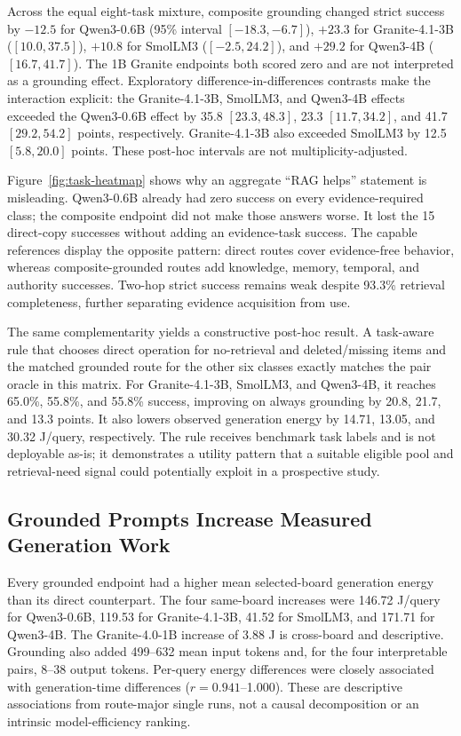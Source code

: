 Across the equal eight-task mixture, composite grounding changed strict success by
$-12.5$ \pp{} for Qwen3-0.6B (95\% interval $[-18.3,-6.7]$), $+23.3$ for
Granite-4.1-3B ($[10.0,37.5]$), $+10.8$ for SmolLM3 ($[-2.5,24.2]$), and $+29.2$
for Qwen3-4B ($[16.7,41.7]$). The 1B Granite endpoints both scored zero and are not
interpreted as a grounding effect. Exploratory difference-in-differences contrasts
make the interaction explicit: the Granite-4.1-3B, SmolLM3, and Qwen3-4B effects
exceeded the Qwen3-0.6B effect by 35.8 $[23.3,48.3]$, 23.3 $[11.7,34.2]$, and
41.7 $[29.2,54.2]$ points, respectively. Granite-4.1-3B also exceeded SmolLM3 by
12.5 $[5.8,20.0]$ points. These post-hoc intervals are not multiplicity-adjusted.

Figure~\ref{fig:task-heatmap} shows why an aggregate ``RAG helps'' statement is
misleading. Qwen3-0.6B already had zero success on every evidence-required class;
the composite endpoint did not make those answers worse. It lost the 15
direct-copy successes without adding an evidence-task success. The capable
references display the opposite pattern: direct routes cover evidence-free
behavior, whereas composite-grounded routes add knowledge, memory, temporal, and
authority successes. Two-hop strict
success remains weak despite 93.3\% retrieval completeness, further separating
evidence acquisition from use.



The same complementarity yields a constructive post-hoc result. A task-aware rule
that chooses direct operation for no-retrieval and deleted/missing items and the
matched grounded route for the other six classes exactly matches the pair oracle in
this matrix. For Granite-4.1-3B, SmolLM3, and Qwen3-4B, it reaches 65.0\%, 55.8\%,
and 55.8\% success, improving on always grounding by 20.8, 21.7, and 13.3 points.
It also lowers observed generation energy by 14.71, 13.05, and 30.32 J/query,
respectively. The rule receives benchmark task labels and is not deployable as-is;
it demonstrates a utility pattern that a suitable eligible pool and
retrieval-need signal could potentially exploit in a prospective study.

\subsection{Grounded Prompts Increase Measured Generation Work}

Every grounded endpoint had a higher mean selected-board generation energy than its
direct counterpart. The four same-board increases were 146.72 J/query for
Qwen3-0.6B, 119.53 for Granite-4.1-3B, 41.52 for SmolLM3, and 171.71 for Qwen3-4B.
The Granite-4.0-1B increase of 3.88 J is cross-board and descriptive. Grounding also
added 499--632 mean input tokens and, for the four interpretable pairs, 8--38 output
tokens. Per-query energy differences were closely associated with generation-time
differences ($r=0.941$--1.000). These are descriptive associations from route-major
single runs, not a causal decomposition or an intrinsic model-efficiency ranking.

